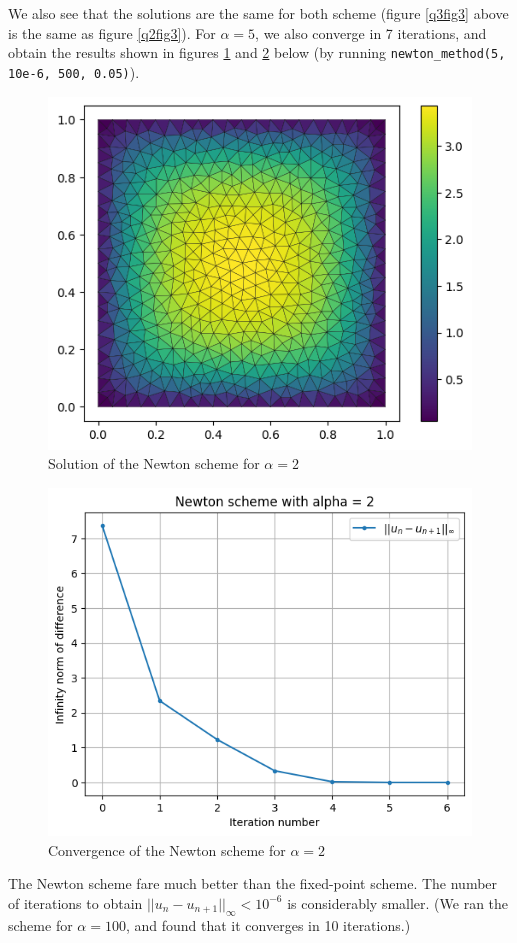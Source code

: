 \documentclass[11pt, a4paper, twoside]{article}
\begin{document}
We also see that the solutions are the same for both scheme (figure \ref{q3fig3} above is the same as figure \ref{q2fig3}).
For $\alpha=5$, we also converge in 7 iterations, and obtain the results shown in figures \ref{q3fig5} and \ref{q3fig6} below (by running \verb+newton_method(5, 10e-6, 500, 0.05)+).

\begin{figure}[H]
\centering
\includegraphics[scale = 0.7]{../Figures/newt_sol_alpha2.png}
\caption{Solution of the Newton scheme for $\alpha=2$}
\label{q3fig5}
\end{figure}

\begin{figure}[H]
\centering
\includegraphics[scale = 0.7]{../Figures/newt_conv_alpha2.png}
\caption{Convergence of the Newton scheme for $\alpha=2$}
\label{q3fig6}
\end{figure}

The Newton scheme fare much better than the fixed-point scheme. The number of iterations to obtain $||u_n -u_{n+1}||_\infty < 10^{-6}$ is considerably smaller. (We ran the scheme for $\alpha=100$, and found that it converges in 10 iterations.)

\end{document}
